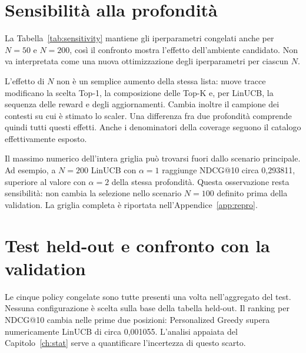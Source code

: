 \section{Sensibilità alla profondità}
La Tabella~\ref{tab:sensitivity} mantiene gli iperparametri congelati anche per $N=50$ e $N=200$, così il confronto mostra l'effetto dell'ambiente candidato. Non va interpretata come una nuova ottimizzazione degli iperparametri per ciascun $N$.
\begin{table}[htbp]\centering\small

\caption{Sensibilità della validation con $\alpha=2$ ed $\varepsilon=0{,}05$ mantenuti fissi.}\label{tab:sensitivity}
\end{table}

L'effetto di $N$ non è un semplice aumento della stessa lista: nuove tracce modificano la scelta Top-1, la composizione delle Top-K e, per LinUCB, la sequenza delle reward e degli aggiornamenti. Cambia inoltre il campione dei contesti su cui è stimato lo scaler. Una differenza fra due profondità comprende quindi tutti questi effetti. Anche i denominatori della coverage seguono il catalogo effettivamente esposto.

Il massimo numerico dell'intera griglia può trovarsi fuori dallo scenario principale. Ad esempio, a $N=200$ LinUCB con $\alpha=1$ raggiunge NDCG@10 circa 0,293811, superiore al valore con $\alpha=2$ della stessa profondità. Questa osservazione resta sensibilità: non cambia la selezione nello scenario $N=100$ definito prima della validation. La griglia completa è riportata nell'Appendice~\ref{app:repro}.

\section{Test held-out e confronto con la validation}
Le cinque policy congelate sono tutte presenti una volta nell'aggregato del test. Nessuna configurazione è scelta sulla base della tabella held-out. Il ranking per NDCG@10 cambia nelle prime due posizioni: Personalized Greedy supera numericamente LinUCB di circa 0,001055. L'analisi appaiata del Capitolo~\ref{ch:stat} serve a quantificare l'incertezza di questo scarto.

\begin{table}[htbp]\centering\footnotesize

\caption{Risultati held-out a $N=100$. Le metriche di lista sono a @10 e la reward è Top-1. L'ordine delle righe identifica le famiglie, non una nuova selezione.}\label{tab:test}
\end{table}

